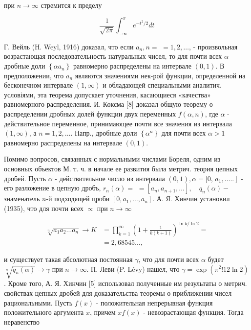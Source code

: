 \documentclass[10pt]{article}
\begin{document}
при $n \rightarrow \infty$ стремится к пределу



\[

\frac{1}{\sqrt{2 \pi}} \int_{-\infty}^{x} e^{-t^{2} / 2} d t

\]



Г. Вейль (Н. Weyl, 1916) доказал, что если $a_{n}, n=$ $=1,2, \ldots$, - произвольная возрастающая последовательность натуральных чисел, то для почти всех $\alpha$ дробные доли $\left\{\alpha a_{n}\right\}$ равномерно распределены на интервале $(0,1)$. В предположении, что $a_{n}$ являются значениями нек-рой функции, определенной на бесконечном интервале $(1, \infty)$ и обладающей специальными аналитич. условіями, эта теорема допускает уточнения, касающиеся «качества» равномерного распределения. И. Коксма [8] доказал общую теорему о распределении дробных долей функции двух переменных $f(\alpha, n)$, где $\alpha$ - действительное переменное, принимающее почти все значения из интервала $(1, \infty)$, а $n=1,2, \ldots$. Напр., дробные доли $\left\{\alpha^{n}\right\}$ для почти всех $\alpha>1$ равномерно распределены на интервале $(0,1)$.



Помимо вопросов, связанных с нормальными числами Бореля, одним из основных объектов М. т. ч. в начале ее развития была метрич. теория цепных дробей. Пусть $\alpha$ - действительное число из интервала $(0,1), \alpha=[0$, $\left.a_{1}, \ldots ..\right]$ - его разложение в цепную дробъ, $r_{n}(\alpha)=$ $=\left[a_{n}, a_{n+1}, \ldots\right], \quad q_{n}(\alpha)-$ знаменатель $n$-й подходящей цроби $\left[0, a_{1}, \ldots, a_{n}\right]$. А. Я. Хинчин установил (1935), что для почти всех $\propto$ при $n \rightarrow \infty$



\[

\begin{aligned}

\sqrt[n]{a_{1} a_{2} \ldots a_{n}} \rightarrow K & =\prod_{k=1}^{\infty}\left(1+\frac{1}{k(k+1)}\right)^{\ln k / \ln 2}= \\

& =2,68545 \ldots,

\end{aligned}

\]



и существует такая абсолютная постоянная $\gamma$, что для почти всех $\alpha$ будет $\sqrt[n]{q_{n}(\alpha)} \rightarrow \gamma$ при $n \rightarrow \infty$. П. Леви (P. Lévy) нашел, что $\gamma=\exp \left(\pi^{2} ! 12 \ln 2\right)$. Кроме того, А. Я. Хинчин [5] использовал полученные им результаты о метрич. свойствах цепных дробей для доказательства теоремы о приближении чисел рациональными. Пусть $f(x)$ - положительная непрерывная функция положительного аргумента $x$, причем $x f(x)$ - невозрастающая функция. Тогда неравенство
\end{document}
